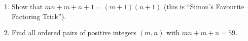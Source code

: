 \begin{enumerate}
\item[(a)] Show that $mn+m+n+1=(m+1)(n+1)$ (this is ``Simon's Favourite Factoring Trick'').
\item[(b)] Find all ordered pairs of positive integers $(m,n)$ with $mn+m+n=59$.
\end{enumerate}
